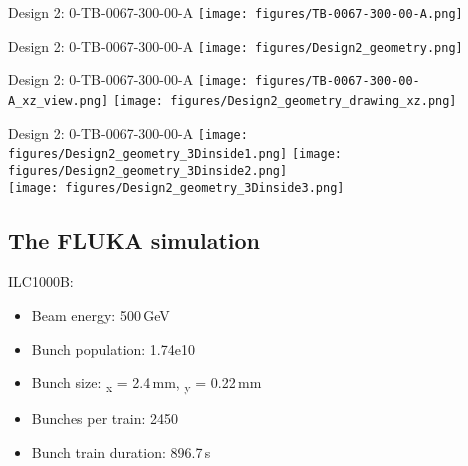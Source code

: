 \documentclass[xcolor={dvipsnames}]{beamer}
\begin{document}
\begin{frame}{Design 2: 0-TB-0067-300-00-A}
\centering
  \texttt{[image: figures/TB-0067-300-00-A.png]}
\end{frame}
\begin{frame}{Design 2: 0-TB-0067-300-00-A}
\centering
  \texttt{[image: figures/Design2\_geometry.png]}
\end{frame}
\begin{frame}{Design 2: 0-TB-0067-300-00-A}
\centering
  \texttt{[image: figures/TB-0067-300-00-A\_xz\_view.png]}
  \hfill
  \texttt{[image: figures/Design2\_geometry\_drawing\_xz.png]}
\end{frame}
\begin{frame}{Design 2: 0-TB-0067-300-00-A}
\centering
  \texttt{[image: figures/Design2\_geometry\_3Dinside1.png]}
    \texttt{[image: figures/Design2\_geometry\_3Dinside2.png]}\\
      \texttt{[image: figures/Design2\_geometry\_3Dinside3.png]}
\end{frame}



\subsection{The FLUKA simulation}
\begin{frame}
 ILC1000B:
 \begin{itemize}
  \item Beam energy: 500\,GeV
  \item Bunch population: 1.74e10
  \item Bunch size: \textsigma\textsubscript{x} = 2.4\,mm, \textsigma\textsubscript{y} = 0.22\,mm
  \item Bunches per train: 2450
  \item Bunch train duration: 896.7\,\textmu s
 \end{itemize}

\end{frame}
\end{document}
